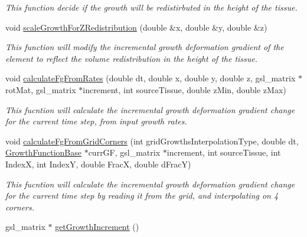 \begin{DoxyCompactItemize}
\begin{DoxyCompactList}\small\item\em This function decide if the growth will be redistirbuted in the height of the tissue. \end{DoxyCompactList}\item 
void \hyperlink{classShapeBase_aace7f6727db271b84db82d0560d26b86}{scale\+Growth\+For\+Z\+Redistribution} (double \&x, double \&y, double \&z)
\begin{DoxyCompactList}\small\item\em This function will modify the incremental growth deformation gradient of the element to reflect the volume redistribution in the height of the tissue. \end{DoxyCompactList}\item 
void \hyperlink{classShapeBase_a45508a35016a845b9c3b2d8f7d51479a}{calculate\+Fg\+From\+Rates} (double dt, double x, double y, double z, gsl\+\_\+matrix $\ast$rot\+Mat, gsl\+\_\+matrix $\ast$increment, int source\+Tissue, double z\+Min, double z\+Max)
\begin{DoxyCompactList}\small\item\em This fucntion will calculate the incremental growth deformation gradient change for the current time step, from input growth rates. \end{DoxyCompactList}\item 
void \hyperlink{classShapeBase_a23ed61e92393b0d7364a4a99ac0f77f9}{calculate\+Fg\+From\+Grid\+Corners} (int grid\+Growths\+Interpolation\+Type, double dt, \hyperlink{classGrowthFunctionBase}{Growth\+Function\+Base} $\ast$curr\+G\+F, gsl\+\_\+matrix $\ast$increment, int source\+Tissue, int Index\+X, int Index\+Y, double Frac\+X, double d\+Frac\+Y)
\begin{DoxyCompactList}\small\item\em This fucntion will calculate the incremental growth deformation gradient change for the current time step by reading it from the grid, and interpolating on 4 corners. \end{DoxyCompactList}\item 
\hypertarget{classShapeBase_acfee9abf0c9b00e278762688525ef333}{}gsl\+\_\+matrix $\ast$ \hyperlink{classShapeBase_acfee9abf0c9b00e278762688525ef333}{get\+Growth\+Increment} ()\label{classShapeBase_acfee9abf0c9b00e278762688525ef333}


\end{DoxyCompactItemize}
